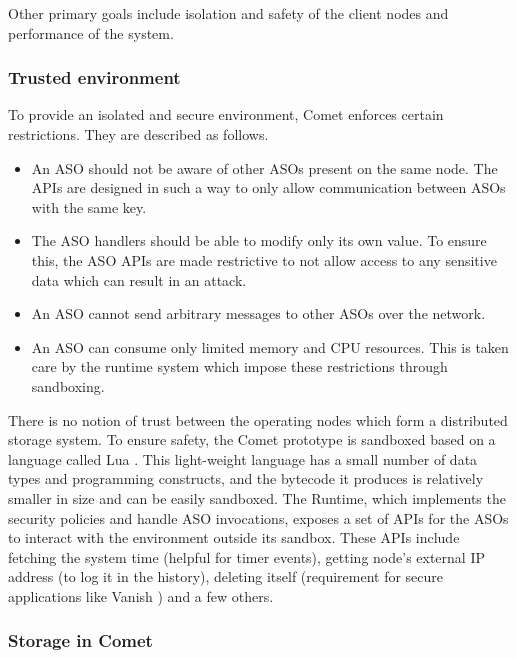 \documentclass[11pt,a4paper]{article}
\begin{document}
    Other primary goals include isolation and safety of the client nodes and performance of the system.
    
    \subsubsection{Trusted environment}
    
    To provide an isolated and secure environment, Comet enforces certain restrictions. They are described as follows.
    
    \begin{itemize}
        \item	An ASO should not be aware of other ASOs present on the same node. The APIs are designed in such a way to only allow communication between ASOs with the same key.
        \item	The ASO handlers should be able to modify only its own value. To ensure this, the ASO APIs are made restrictive to not allow access to any sensitive data which can result in an attack.
        \item	An ASO cannot send arbitrary messages to other ASOs over the network.
        \item	An ASO can consume only limited memory and CPU resources. This is taken care by the runtime system which impose these restrictions through sandboxing.
        
    \end{itemize}
    
    There is no notion of trust between the operating nodes which form a distributed storage system. To ensure safety, the Comet prototype is sandboxed based on a language called Lua \cite{LuaIerusalimschy}. This light-weight language has a small number of data types and programming constructs, and the bytecode it produces is relatively smaller in size and can be easily sandboxed. The Runtime, which implements the security policies and handle ASO invocations, exposes a set of APIs for the ASOs to interact with the environment outside its sandbox. These APIs include fetching the system time (helpful for timer events), getting node’s external IP address (to log it in the history), deleting itself (requirement for secure applications like Vanish \cite{geambasu2009vanish}) and a few others.
    
    \subsubsection{Storage in Comet}
    
\end{document}
